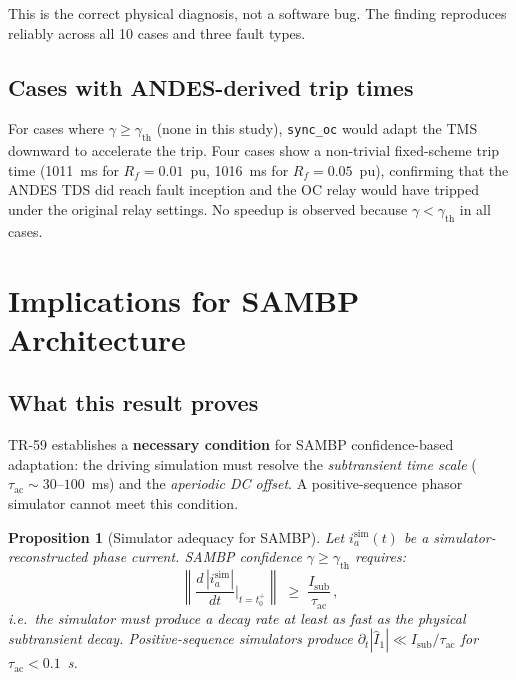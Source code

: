 \documentclass[11pt,a4paper]{article}
\newtheorem{proposition}{Proposition}
\newcommand{\Isub}{I_{\text{sub}}}
\newcommand{\tauac}{\tau_{\text{ac}}}
\newcommand{\gconf}{\gamma}
\newcommand{\gth}{\gamma_{\text{th}}}
\begin{document}
This is the correct physical diagnosis, not a software bug.  The finding
reproduces reliably across all 10 cases and three fault types.

\subsection{Cases with ANDES-derived trip times}

For cases where $\gconf \geq \gth$ (none in this study), \texttt{sync\_oc}
would adapt the TMS downward to accelerate the trip.  Four cases show a
non-trivial fixed-scheme trip time (1011~ms for $R_f = 0.01$~pu,
1016~ms for $R_f = 0.05$~pu), confirming that the ANDES TDS did reach
fault inception and the OC relay would have tripped under the original
relay settings.  No speedup is observed because $\gconf < \gth$ in all cases.

\section{Implications for SAMBP Architecture}
\label{sec:implications}

\subsection{What this result proves}

TR-59 establishes a \textbf{necessary condition} for SAMBP confidence-based
adaptation: the driving simulation must resolve the \emph{subtransient time
scale} ($\tauac \sim 30\text{--}100$~ms) and the \emph{aperiodic DC offset}.
A positive-sequence phasor simulator cannot meet this condition.

\begin{proposition}[Simulator adequacy for SAMBP]
Let $i_a^{\text{sim}}(t)$ be a simulator-reconstructed phase current.
SAMBP confidence $\gconf \geq \gth$ requires:
\begin{equation}
  \left\|\frac{d\,|i_a^{\text{sim}}|}{dt}\bigg|_{t=t_0^+}\right\|
  \;\geq\; \frac{\Isub}{\tauac}\,,
  \label{eq:adequacy}
\end{equation}
i.e.\ the simulator must produce a decay rate at least as fast as the
physical subtransient decay.  Positive-sequence simulators produce
$\partial_t |\hat{I}_1| \ll \Isub/\tauac$ for $\tauac < 0.1$~s.
\end{proposition}
\end{document}
